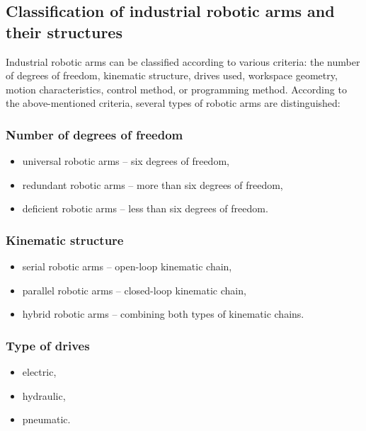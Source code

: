 
\subsection{Classification of industrial robotic arms and their structures}

Industrial robotic arms can be classified according to various criteria: the number of degrees of freedom, kinematic structure, drives used, workspace geometry, motion characteristics, control method, or programming method. According to the above-mentioned criteria, several types of robotic arms are distinguished:

\subsubsection*{Number of degrees of freedom}

\begin{itemize}
    \item universal robotic arms -- six degrees of freedom,
    \item redundant robotic arms -- more than six degrees of freedom,
    \item deficient robotic arms -- less than six degrees of freedom.
\end{itemize}

\subsubsection*{Kinematic structure}

\begin{itemize}
    \item serial robotic arms -- open-loop kinematic chain,
    \item parallel robotic arms -- closed-loop kinematic chain,
    \item hybrid robotic arms -- combining both types of kinematic chains.
\end{itemize}


\subsubsection*{Type of drives}

\begin{itemize}
    \item electric,
    \item hydraulic,
    \item pneumatic.
\end{itemize}

